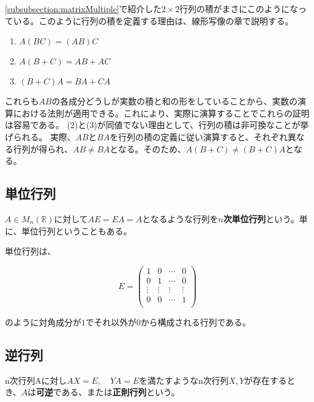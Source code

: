 \documentclass[dvipdfmx,autodetect-engine]{jsarticle}
\begin{document}
\ref{subsubsection:matrixMultiple}で紹介した$2 \times 2$行列の積がまさにこのようになっている。このように行列の積を定義する理由は、線形写像の章で説明する。


\begin{enumerate}
\renewcommand{\labelenumi}{(\arabic{enumi})}
\item $A(BC) = (AB)C$
\item $A(B+C) = AB + AC$
\item $(B+C)A = BA + CA$
\end{enumerate}

これらも$AB$の各成分どうしが実数の積と和の形をしていることから、実数の演算における法則が適用できる。これにより、実際に演算することでこれらの証明は容易である。
(2)と(3)が同値でない理由として、行列の積は非可換なことが挙げられる。
実際、$AB$と$BA$を行列の積の定義に従い演算すると、それぞれ異なる行列が得られ、$AB \neq BA$となる。そのため、$A(B+C) \neq (B+C)A$となる。

\subsection{単位行列}


$A \in M_n(\mathbb{R})$に対して$AE = EA = A$となるような行列を{\bf $n$次単位行列}という。単に、単位行列ということもある。

単位行列は、

$$
E = \begin{pmatrix}
1 & 0 & \cdots & 0 \\
0 & 1 & \cdots & 0 \\
\vdots & \vdots & \vdots & \vdots \\
0 & 0 & \cdots & 1 \\
\end{pmatrix}
$$

のように対角成分が$1$でそれ以外が$0$から構成される行列である。


\subsection{逆行列}

n次行列Aに対し$AX = E, \quad YA = E$を満たすようなn次行列$X, Y$が存在するとき、$A$は{\bf 可逆}である、または{\bf 正則行列}という。

\end{document}
